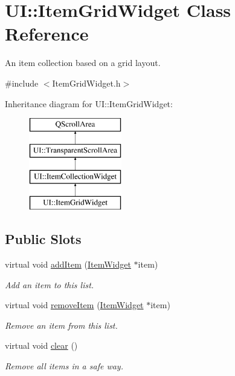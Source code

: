 \hypertarget{class_u_i_1_1_item_grid_widget}{\section{U\-I\-:\-:Item\-Grid\-Widget Class Reference}
\label{class_u_i_1_1_item_grid_widget}
}


An item collection based on a grid layout.  




{\ttfamily \#include $<$Item\-Grid\-Widget.\-h$>$}

Inheritance diagram for U\-I\-:\-:Item\-Grid\-Widget\-:\begin{figure}[H]
\begin{center}
\leavevmode
\includegraphics[height=4.000000cm]{class_u_i_1_1_item_grid_widget}
\end{center}
\end{figure}
\subsection*{Public Slots}
\begin{DoxyCompactItemize}
\item 
virtual void \hyperlink{class_u_i_1_1_item_grid_widget_a567b738ea03d93bb7fbd97028582faa8}{add\-Item} (\hyperlink{class_u_i_1_1_item_widget}{Item\-Widget} $\ast$item)
\begin{DoxyCompactList}\small\item\em Add an item to this list. \end{DoxyCompactList}\item 
virtual void \hyperlink{class_u_i_1_1_item_grid_widget_a9eedf42de4ad005e935e779697dd4feb}{remove\-Item} (\hyperlink{class_u_i_1_1_item_widget}{Item\-Widget} $\ast$item)
\begin{DoxyCompactList}\small\item\em Remove an item from this list. \end{DoxyCompactList}\item 
virtual void \hyperlink{class_u_i_1_1_item_grid_widget_a19bb3fe1146eab42e10a109997e50ab6}{clear} ()
\begin{DoxyCompactList}\small\item\em Remove all items in a safe way. \end{DoxyCompactList}\end{DoxyCompactItemize}
